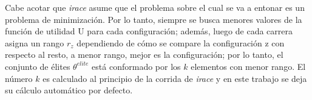 Cabe acotar que \emph{irace} asume que el problema sobre el cual se va a entonar es un problema de minimización. Por lo tanto, siempre se busca menores valores de la función de utilidad U para cada configuración; además, luego de cada carrera asigna un rango $r_z$ dependiendo de cómo se compare la configuración z con respecto al resto, a menor rango, mejor es la configuración; por lo tanto, el conjunto de élites $\theta^{elite}$ está conformado por los $k$ elementos con menor rango. El número $k$ es calculado al principio de la corrida de \emph{irace} y en este trabajo se deja su cálculo automático por defecto.





